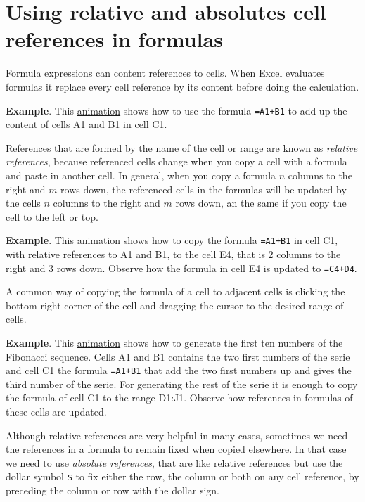 \section{Using relative and absolutes cell references in formulas}\hypertarget{using-relative-and-absolutes-cell-references-in-formulas}{}\label{using-relative-and-absolutes-cell-references-in-formulas}

Formula expressions can content references to cells. When Excel evaluates formulas it replace every cell reference by its content before doing the calculation.

\textbf{Example}. This
\href{http://aprendeconalf.es/office/excel/manual/img/example_formulas_with_references.gif}{animation} shows how to use
the formula \texttt{=A1+B1} to add up the content of cells A1 and B1 in cell C1.

References that are formed by the name of the cell or range are known as \emph{relative references}, because referenced
cells change when you copy a cell with a formula and paste in another cell. In general, when you copy a formula $n$
columns to the right and $m$ rows down, the referenced cells in the formulas will be updated by the cells $n$ columns to
the right and $m$ rows down, an the same if you copy the cell to the left or top.

\textbf{Example}. This \href{http://aprendeconalf.es/office/excel/manual/img/example_copying_formulas_with_relative_references.gif}{animation} shows how to copy the formula \texttt{=A1+B1} in cell C1, with relative references to A1 and B1, to the cell E4, that is 2 columns to the right and 3 rows down. Observe how the formula in cell E4 is updated to \texttt{=C4+D4}.

A common way of copying the formula of a cell to adjacent cells is clicking the bottom-right corner of the cell and
dragging the cursor to the desired range of cells.

\textbf{Example}. This \href{http://aprendeconalf.es/office/excel/manual/img/example_fibonacci_serie.gif}{animation}
shows how to generate the first ten numbers of the Fibonacci sequence. Cells A1 and B1 contains the two first numbers of
the serie and cell C1 the formula \texttt{=A1+B1} that add the two first numbers up and gives the third number of the
serie. For generating the rest of the serie it is enough to copy the formula of cell C1 to the range D1:J1. Observe how
references in formulas of these cells are updated.

Although relative references are very helpful in many cases, sometimes we need the references in a formula to remain fixed when copied elsewhere.\newline
In that case we need to use \emph{absolute references}, that are like relative references but use the dollar symbol \texttt{\$} to fix either the row, the column or both on any cell reference, by preceding the column or row with the dollar sign.

